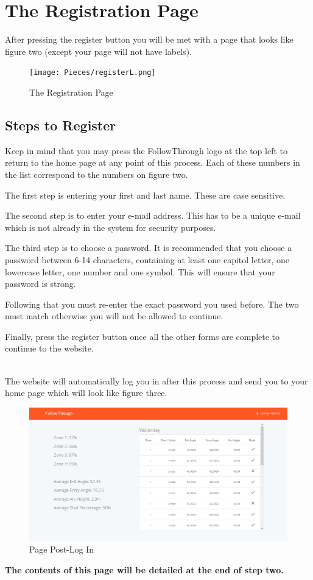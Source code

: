 \section{The Registration Page}
After pressing the register button you will be met with a page that looks like figure two (except your page will not have labels).

\begin{figure}[h]
    \caption{The Registration Page}
    \texttt{[image: Pieces/registerL.png]}
\end{figure}

\newpage

\subsection{Steps to Register}
Keep in mind that you may press the FollowThrough logo at the top left to return to the home page at any point of this process. Each of these numbers in the list correspond to the numbers on figure two. 

\begin{enumerate}[{[1]}]
\item The first step is entering your first and last name. These are case sensitive.
\item The second step is to enter your e-mail address. This has to be a unique e-mail which is not already in the system for security purposes.
\item The third step is to choose a password. It is recommended that you choose a password between 6-14 characters, containing at least one capitol letter, one lowercase letter, one number and one symbol. This will ensure that your password is strong.
\item Following that you must re-enter the exact password you used before. The two must match otherwise you will not be allowed to continue.
\item Finally, press the register button once all the other forms are complete to continue to the website.
\end{enumerate}

\\The website will automatically log you in after this process and send you to your home page which will look like figure three.

\begin{figure}[h]
    \caption{Page Post-Log In}
    \includegraphics[width = 1 \textwidth]{Pieces/data.PNG}
\end{figure}

\textbf{The contents of this page will be detailed at the end of step two.}